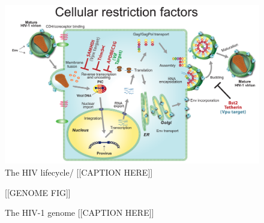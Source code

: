 \documentclass[../sherrill-Mix_thesis.tex]{subfiles}
\begin{document}
\begin{figure}
	\centering
	\includegraphics[width=\textwidth]{LifeCycleJan2012small-1.pdf} %
	\caption[The HIV lifecycle]{The HIV lifecycle/ [[CAPTION HERE]]}
	\label{figHIVLifecycle}
\end{figure}

\begin{figure}
	\centering
	[[GENOME FIG]]
	\caption[The HIV-1 genome]{The HIV-1 genome [[CAPTION HERE]]}
	\label{figHIVGenome}
\end{figure}
\end{document}
